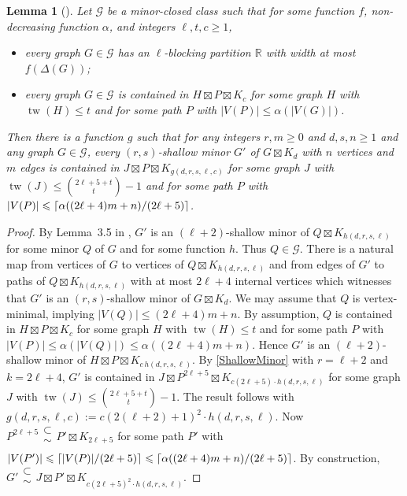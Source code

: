 \documentclass[11pt]{article}
\newcommand{\GG}{\mathcal{G}}
\DeclarePairedDelimiter{\ceil}{\lceil}{\rceil}
\renewcommand{\geq}{\geqslant}
\renewcommand{\leq}{\leqslant}
\newcommand{\subsetsim}{\mathrel{\substack{\textstyle\subset\\[-0.3ex]\textstyle\sim\\[-0.4ex]}}}
\DeclareMathOperator{\tw}{tw}
\theoremstyle{plain}
\newtheorem{lem}[thm]{Lemma}
\theoremstyle{definition}
\newcommand{\RR}{\mathbb{R}}
\begin{document}
\begin{lem}[\citep{DHSW24}] 
\label{MinorBlockingShallowProduct} 
Let $\GG$ be a minor-closed class such that for some function $f$, non-decreasing function $\alpha$, and integers $\ell,t,c\geq 1$, 
\begin{itemize}
\item every graph \(G\in \GG\) has an $\ell$-blocking partition $\RR$ with width at most $f(\Delta(G))$;
\item  every graph $G\in\GG$ is contained in $H \boxtimes P \boxtimes K_c$  for some graph $H$ with $\tw(H)\leq t$ and for some path $P$ with $|V(P)|\leq \alpha(|V(G)|)$. 
\end{itemize}
Then there is a function $g$ such that for any  integers $r,m\geq 0$ and $d,s,n\geq 1$ and any graph $G\in\GG$, every $(r,s)$-shallow minor $G'$ of $G\boxtimes K_{d}$ with $n$ vertices and $m$ edges is contained in $J \boxtimes P \boxtimes K_{g(d,r,s,\ell,c)}$ for some graph $J$ with $\tw(J)\leq \binom{2\ell+5+t}{t}-1$ and for some path $P$ with  $|V(P)|\leq \ceil{ \alpha((2\ell+4)m + n) / (2\ell+5)}$. 
\end{lem}

\begin{proof} 
By Lemma~3.5 in \citep{DHSW24}, $G'$ is an $(\ell+2)$-shallow minor of  $Q \boxtimes K_{h(d,r,s,\ell)}$ for some minor $Q$ of $G$ and for some function $h$. 
Thus $Q\in \GG$. 
There is a natural map from vertices of $G$ to vertices of $Q\boxtimes K_{h(d,r,s,\ell)}$ and from edges of $G'$ to paths of $Q\boxtimes K_{h(d,r,s,\ell)}$ with at most $2\ell+4$ internal vertices which witnesses that $G'$ is an $(r,s)$-shallow minor of $G\boxtimes K_{d}$. 
We may assume that $Q$ is vertex-minimal, implying $|V(Q)|\leq (2\ell+4)m+n$. 
By assumption, $Q$ is contained in $H \boxtimes P \boxtimes K_c$  for some graph $H$ with $\tw(H)\leq t$ and for some path $P$ with $|V(P)|\leq \alpha(|V(Q)|) \leq \alpha((2\ell+4)m + n)$. Hence $G'$ is an $(\ell+2)$-shallow minor of $H \boxtimes P \boxtimes K_{c\,h(d,r,s,\ell)}$. 
By \cref{ShallowMinor} with $r=\ell+2$ and $k=2\ell+4$, 
$G'$ is contained in $ J \boxtimes P^{2\ell+5} \boxtimes K_{c(2\ell+5)\cdot h(d,r,s,\ell)}$ for some graph $J$ with $\tw(J)\leq \binom{2\ell+5+t}{t}-1$. The result follows with $g(d,r,s,\ell,c) := c(2(\ell+2)+1)^2\cdot h(d,r,s,\ell)$. 
Now $P^{2\ell+5}\subsetsim P' \boxtimes K_{2\ell+5}$ for some path $P'$ with $|V(P')|\leq \ceil{ |V(P)| / (2\ell+5)} \leq \ceil{ \alpha((2\ell+4)m + n) / (2\ell+5)}$. By construction, $G'\subsetsim J \boxtimes P' \boxtimes K_{c(2\ell+5)^2\cdot h(d,r,s,\ell)}$. 
\end{proof}
		
\end{document}
